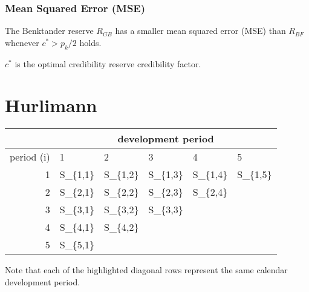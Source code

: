 \documentclass{article}
\begin{document}
\subsubsection{Mean Squared Error (MSE)}

The Benktander reserve $R_{GB}$ has a smaller mean squared error
(MSE) than $R_{BF}$ whenever $c^* > p_k / 2$ holds.

$c^*$ is the optimal credibility reserve credibility factor.

\newpage

\section{Hurlimann }

\begin{center}
  \begin{tabular}{|r|l|l|l|l|l|}
    \hline
    & \multicolumn{5}{c|}{development period} \\
    \hline
    period (i) & 1 & 2 & 3 & 4 & 5 \\
    \hline
    1 & S\_\{1,1\} & \cellcolor{blue!50}S\_\{1,2\} &
    \cellcolor{yellow!20}S\_\{1,3\} &
    \cellcolor{yellow!80}S\_\{1,4\} & \cellcolor{purple!20}S\_\{1,5\} \\
    \hline
    2 & \cellcolor{blue!50}S\_\{2,1\} & \cellcolor{yellow!20}S\_\{2,2\} &
    \cellcolor{yellow!80}S\_\{2,3\} & \cellcolor{purple!20}S\_\{2,4\} &  \\
    \hline
    3 & \cellcolor{yellow!20}S\_\{3,1\} & \cellcolor{yellow!80}S\_\{3,2\} &
    \cellcolor{purple!20}S\_\{3,3\} &  &  \\
    \hline
    4 & \cellcolor{yellow!80}S\_\{4,1\} &
    \cellcolor{purple!20}S\_\{4,2\} &  &  &  \\
    \hline
    5 & \cellcolor{purple!20}S\_\{5,1\} &  &  &  &  \\
    \hline
  \end{tabular}
\end{center}

Note that each of the highlighted diagonal rows represent the same
calendar development period.
\end{document}
